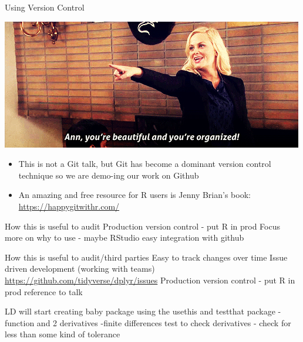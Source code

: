 \documentclass[
  ignorenonframetext,
]{beamer}
\providecommand{\tightlist}{%
  \setlength{\itemsep}{0pt}\setlength{\parskip}{0pt}}
\begin{document}
\begin{frame}{Using Version Control}
\protect\hypertarget{using-version-control}{}

\includegraphics[width=1\linewidth]{pics/ann}

\begin{itemize}
\tightlist
\item
  This is not a Git talk, but Git has become a dominant version control
  technique so we are demo-ing our work on Github
\item
  An amazing and free resource for R users is Jenny Brian's book:
  \url{https://happygitwithr.com/}
\end{itemize}

How this is useful to audit Production version control - put R in prod
Focus more on why to use - maybe RStudio easy integration with github

How this is useful to audit/third parties Easy to track changes over
time Issue driven development (working with teams)
\url{https://github.com/tidyverse/dplyr/issues} Production version
control - put R in prod reference to talk

LD will start creating baby package using the usethis and testthat
package -function and 2 derivatives -finite differences test to check
derivatives - check for less than some kind of tolerance

\end{frame}
\end{document}
